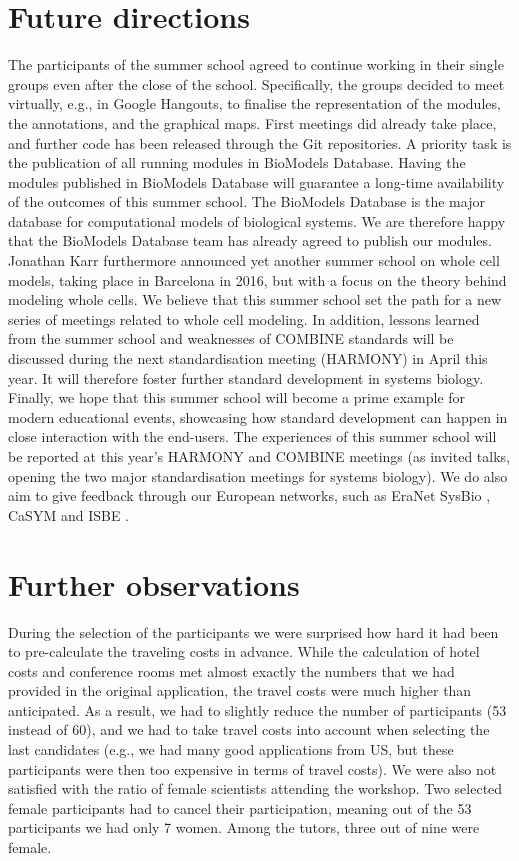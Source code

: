 \documentclass[journal,transmag]{IEEEtran}
\begin{document}
\section{Future directions}
The participants of the summer school agreed to continue working in their single groups even after the close of the school. 
Specifically, the groups decided to meet virtually, e.g., in Google Hangouts, to finalise the representation of the modules, the annotations, and the graphical
maps. 
First meetings did already take place, and further code has been released through the Git repositories.
A priority task is the publication of all running modules in BioModels Database. 
Having the modules published in BioModels Database will guarantee a long-time availability of the outcomes of this summer school. 
The BioModels Database is the major database for computational models of biological systems. 
We are therefore happy that the BioModels Database team has already agreed to publish our modules. 
Jonathan Karr furthermore announced yet another summer school on whole cell models, taking place in Barcelona in 2016, but with a focus on the theory behind modeling whole cells. 
We believe that this summer school set the path for a new series of meetings related to whole cell modeling.
In addition, lessons learned from the summer school and weaknesses of COMBINE standards will be discussed during the next standardisation meeting (HARMONY) in April this year. 
It will therefore foster further standard development in systems biology. 
Finally, we hope that this summer school will become a prime example for modern educational events, showcasing how standard development can happen in close interaction with the end-users. 
The experiences of this summer school will be reported at this year's HARMONY and COMBINE meetings (as invited talks, opening the two major standardisation meetings for
systems biology). 
We do also aim to give feedback through our European networks, such as EraNet SysBio \cite{}, CaSYM \cite{} and ISBE \cite{}.

\section{Further observations}
During the selection of the participants we were surprised how hard it had been to pre-calculate the traveling costs in advance. 
While the calculation of hotel costs and conference rooms met almost exactly the numbers that we had provided in the original application, the travel costs
were much higher than anticipated. 
As a result, we had to slightly reduce the number of participants (53 instead of 60), and we had to take travel costs into account when selecting the
last candidates (e.g., we had many good applications from US, but these participants were then too expensive in terms of travel costs).
We were also not satisfied with the ratio of female scientists attending the workshop. 
Two selected female participants had to cancel their participation, meaning out of the 53 participants we had only 7 women. 
Among the tutors, three out of nine were female.
\end{document}
